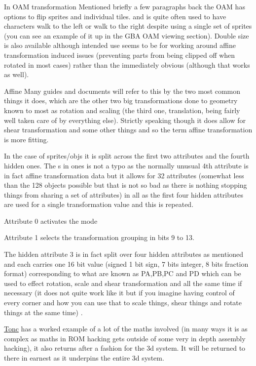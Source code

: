 \documentclass[
]{book}
\begin{document}
In OAM transformation Mentioned briefly a few paragraphs back the OAM has options to flip sprites and individual tiles. and is quite often used to have characters walk to the left or walk to the right despite using a single set of sprites (you can see an example of it up in the GBA OAM viewing section). Double size is also available although intended use seems to be for working around affine transformation induced issues (preventing parts from being clipped off when rotated in most cases) rather than the immediately obvious (although that works as well).

Affine Many guides and documents will refer to this by the two most common things it does, which are the other two big transformations done to geometry known to most as rotation and scaling (the third one, translation, being fairly well taken care of by everything else). Strictly speaking though it does allow for shear transformation and some other things and so the term affine transformation is more fitting.

In the case of sprites/objs it is split across the first two attributes and the fourth hidden ones. The s in ones is not a typo as the normally unusual 4th attribute is in fact affine transformation data but it allows for 32 attributes (somewhat less than the 128 objects possible but that is not so bad as there is nothing stopping things from sharing a set of attributes) in all as the first four hidden attributes are used for a single transformation value and this is repeated.

Attribute 0 activates the mode

Attribute 1 selects the transformation grouping in bits 9 to 13.

The hidden attribute 3 is in fact split over four hidden attributes as mentioned and each carries one 16 bit value (signed 1 bit sign, 7 bits integer, 8 bits fraction format) corresponding to what are known as PA,PB,PC and PD which can be used to effect rotation, scale and shear transformation and all the same time if necessary (it does not quite work like it but if you imagine having control of every corner and how you can use that to scale things, shear things and rotate things at the same time) .

\href{http://www.coranac.com/tonc/text/affine.htm}{Tonc} has a worked example of a lot of the maths involved (in many ways it is as complex as maths in ROM hacking gets outside of some very in depth assembly hacking), it also returns after a fashion for the 3d system. It will be returned to there in earnest as it underpins the entire 3d system.
\end{document}
